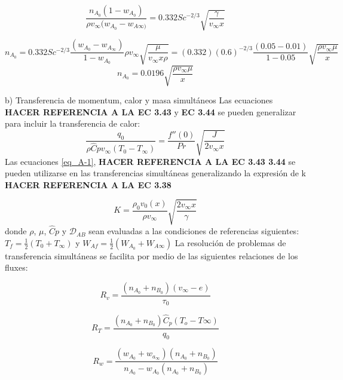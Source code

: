 \begin{equation*}
    \frac{n_{A_0}(1-w_{A_0})}{\rho v_\infty (w_{A_0 }-w_{A\infty)}}=0.332Sc^{-2/3}\sqrt{\frac{\gamma}{v_\infty x}}
\end{equation*}

\begin{equation*}
n_{A_0}=0.332Sc^{-2/3}\frac{(w_{A_0}-w_{A_\infty})}{1-w_{A_0}}\rho v_\infty\sqrt{\frac{\mu}{v_\infty x \rho}}=(0.332)(0.6)^{-2/3}\frac{(0.05-0.01)}{1-0.05}\sqrt{\frac{\rho v_\infty \mu}{x}}
\end{equation*}
\begin{equation*}
    n_{A_0}=0.0196 \sqrt{\frac{\rho v_\infty \mu}{x}}
\end{equation*}
\par
b) Transferencia de momentum, calor y masa simultáneos
\newline
Las ecuaciones \textbf{HACER REFERENCIA A LA EC 3.43} y \textbf{EC 3.44} se pueden generalizar para incluir la transferencia de calor:
\begin{equation}
    \frac{q_0}{\rho \hat{C}pv_\infty(T_0-T_\infty)}=\frac{f''(0)}{Pr}\sqrt{\frac{J}{2v_\infty x}}
    \tag{A-1}
    \label{eq_A-1}
\end{equation}
Las ecuaciones \eqref{eq_A-1}, \textbf{HACER REFERENCIA A LA EC 3.43 3.44} se pueden utilizarse en las transferencias simultáneas generalizando la expresión de k \textbf{HACER REFERENCIA A LA EC 3.38}

\begin{equation}
    K=\frac{\rho_0 v_0 (x)}{\rho v_\infty}\sqrt{\frac{2v_\infty x}{\gamma}}
    \tag{A-2}
    \label{eq_A-2}
\end{equation}
donde $\rho$, $\mu$, $\hat{C}p$ y $\mathscr{D}_{AB}$ sean evaluadas a las condiciones de referencias siguientes: $T_f=\frac{1}{2}(T_0+T_\infty)$ y $W_{Af}=\frac{1}{2}(W_{A_0}+W_{A\infty})$
\newline
La resolución de problemas de transferencia simultáneas se facilita por medio de las siguientes relaciones de los fluxes:

\begin{equation*}
   R_v=\frac{(n_{A_0}+n_{B_0})(v_\infty-e)}{\tau_0} 
\end{equation*}

\begin{equation}
R_T=\frac{(n_{A_0}+n_{B_0})\hat{C}_p(T_o-T\infty)}{q_0} \tag{A-3} \label{eq_A-3}
\end{equation}

\begin{equation*}
R_w=\frac{(w_{A_0}+w_{a_\infty})(n_{A_0}+n_{B_0})}{n_{A_0}-w_{A_0}(n_{A_0}+n_{B_0})}
\end{equation*}

